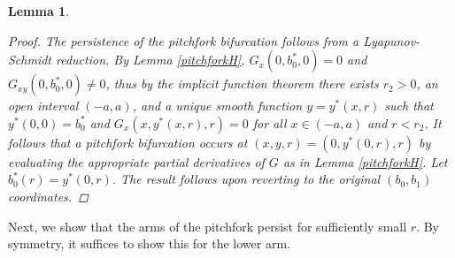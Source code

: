 \documentclass[10pt,reqno]{amsart}
\theoremstyle{plain}
\newtheorem{lemma}[theorem]{Lemma}
\theoremstyle{definition}
\theoremstyle{remark}
\numberwithin{theorem}{section}
\numberwithin{equation}{section}
\begin{document}
\begin{lemma}
\begin{proof}
The persistence of the pitchfork bifurcation follows from a Lyapunov-Schmidt reduction.  By Lemma \ref{pitchforkH}, $G_x(0, b_0^*, 0) = 0$ and $G_{xy}(0, b_0^*, 0) \neq 0$, thus by the implicit function theorem there exists $r_2 > 0$, an open interval $(-a, a)$, and a unique smooth function $y = y^*(x, r)$ such that $y^*(0, 0) = b_0^*$ and $G_x(x, y^*(x, r), r) = 0$ for all $x \in (-a, a)$ and $r < r_2$. It follows that a pitchfork bifurcation occurs at $(x, y, r) = (0, y^*(0, r), r)$ by evaluating the appropriate partial derivatives of $G$ as in Lemma \ref{pitchforkH}. Let $b_0^*(r) = y^*(0, r)$. The result follows upon reverting to the original $(b_0, b_1)$ coordinates.
\end{proof} 
\end{lemma}

Next, we show that the arms of the pitchfork persist for sufficiently small $r$. By symmetry, it suffices to show this for the lower arm.
\end{document}
